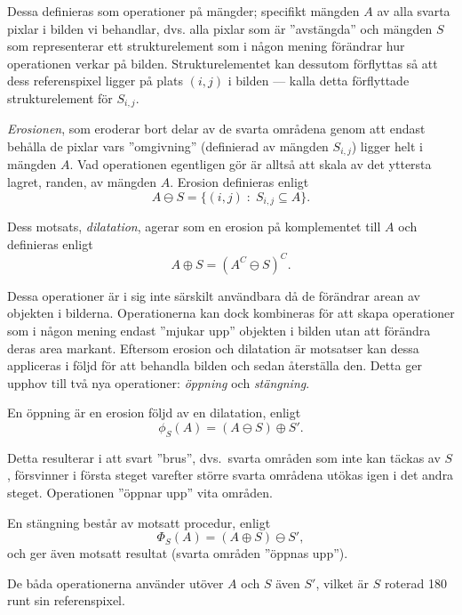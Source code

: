 \documentclass[../rapport_MVEX01-11-05]{subfiles}
\begin{document}
Dessa definieras som operationer på mängder; specifikt mängden $A$
av alla svarta pixlar i bilden vi behandlar, dvs. alla pixlar som är
''avstängda'' och mängden $S$ som representerar ett strukturelement
som i någon mening förändrar hur operationen verkar på bilden.
Strukturelementet kan dessutom förflyttas så att dess referenspixel
ligger på plats $(i,j)$ i bilden --- kalla detta förflyttade
strukturelement för $S_{i,j}$.

\emph{Erosionen}, som eroderar bort delar av de svarta områdena genom
att endast behålla de pixlar vars ''omgivning'' (definierad av mängden
$S_{i,j}$) ligger helt i mängden $A$. Vad operationen egentligen gör är alltså
att skala av det yttersta lagret, randen, av mängden $A$. Erosion definieras enligt
\begin{equation*}
  A\ominus S = \{(i,j)\;:\;S_{i,j}\subseteq A\}.
\end{equation*}

Dess motsats, \emph{dilatation}, agerar som
en erosion på komplementet till $A$ och definieras enligt
\begin{equation*}
  A\oplus S = (A^C\ominus S)^C.
\end{equation*}

Dessa operationer är i sig inte särskilt användbara då de förändrar
arean av objekten i bilderna. Operationerna kan dock kombineras för
att skapa operationer som i någon mening endast 
''mjukar upp'' objekten i bilden utan att förändra deras area markant.
Eftersom erosion och dilatation är motsatser kan dessa appliceras i
följd för att behandla bilden och
sedan återställa den. Detta ger upphov till två nya operationer:
\emph{öppning} och \emph{stängning}.

En öppning är en erosion följd av en dilatation, enligt
\begin{equation*}
  \phi_S(A)=(A\ominus S)\oplus S'.
\end{equation*}

Detta resulterar i att svart ''brus'', dvs.~svarta områden som inte kan täckas av $S$, försvinner i
första steget varefter större svarta områdena utökas igen i det andra
steget. Operationen ''öppnar upp'' vita områden.

En stängning består av motsatt procedur, enligt
\begin{equation*}
  \Phi_S(A)=(A\oplus S)\ominus S',
\end{equation*}
och ger även motsatt resultat (svarta områden ''öppnas upp'').

De
båda operationerna använder utöver $A$ och $S$ även $S'$, vilket är
$S$ roterad 180\textdegree{} runt sin referenspixel.
\end{document}
